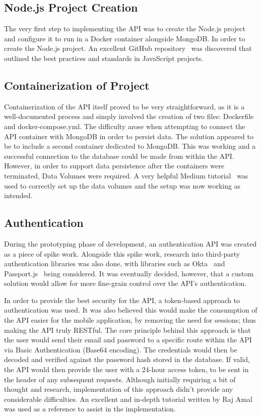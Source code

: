 \subsection{Node.js Project Creation}
The very first step to implementing the API was to create the Node.js project and configure it to run in a Docker container alongside MongoDB. In order to create the Node.js project. An excellent GitHub repository~\cite{js_guidelines_documentation_ref} was discovered that outlined the best practices and standards in JavaScript projects.

\subsection{Containerization of Project}
Containerization of the API itself proved to be very straightforward, as it is a well-documented process and simply involved the creation of two files: Dockerfile and docker-compose.yml. The difficulty arose when attempting to connect the API container with MongoDB in order to persist data. The solution appeared to be to include a second container dedicated to MongoDB. This was working and a successful connection to the database could be made from within the API. However, in order to support data persistence after the containers were terminated, Data Volumes were required. A very helpful Medium tutorial~\cite{docker_medium_tutorial_ref} was used to correctly set up the data volumes and the setup was now working as intended.

\subsection{Authentication}
During the prototyping phase of development, an authentication API was created as a piece of spike work. Alongside this spike work, research into third-party authentication libraries was also done, with libraries such as Okta~\cite{okta_documentation_ref} and Passport.js~\cite{passport_documentation_ref} being considered. It was eventually decided, however, that a custom solution would allow for more fine-grain control over the API's authentication.

In order to provide the best security for the API, a token-based approach to authentication was used. It was also believed this would make the consumption of the API easier for the mobile application, by removing the need for sessions; thus making the API truly RESTful. The core principle behind this approach is that the user would send their email and password to a specific route within the API via Basic Authentication (Base64 encoding). The credentials would then be decoded and verified against the password hash stored in the database. If valid, the API would then provide the user with a 24-hour access token, to be sent in the header of any subsequent requests. Although initially requiring a bit of thought and research, implementation of this approach didn't provide any considerable difficulties. An excellent and in-depth tutorial written by Raj Amal~\cite{nodejs_authentication_tutorial_ref} was used as a reference to assist in the implementation.

